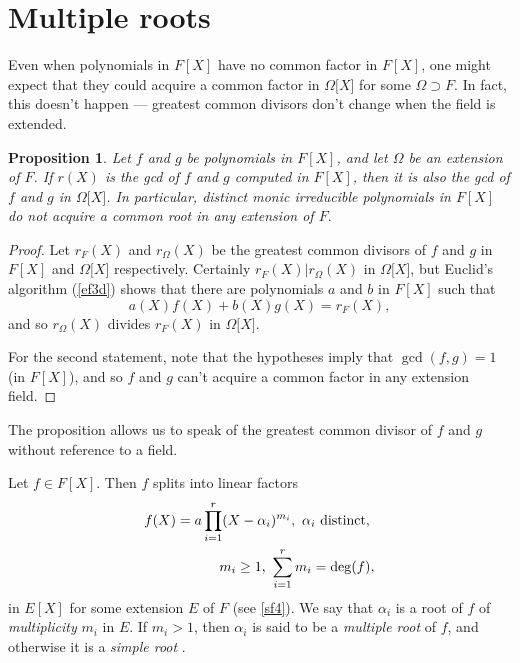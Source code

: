 \documentclass[a4paper,11pt,final,openany]{memoir}
\newtheorem{proposition}[X]{Proposition}
\theoremstyle{nonumberplain}
\newtheorem{proof}{Proof.}
\begin{document}
\section{Multiple roots}

Even when polynomials in $F[X]$ have no common factor in $F[X]$, one might
expect that they could acquire a common factor in $\Omega\lbrack X]$ for some
$\Omega\supset F$. In fact, this doesn't happen --- greatest common divisors
don't change when the field is extended.

\begin{proposition}
\label{ft1}Let $f$ and $g$ be polynomials in $F[X]$, and let $\Omega$ be an
extension of $F$. If $r(X)$ is the gcd of $f$ and $g$ computed in $F[X]$, then
it is also the gcd of $f$ and $g$ in $\Omega\lbrack X]$. In particular,
distinct monic irreducible polynomials in $F[X]$ do not acquire a common root
in any extension of $F.$
\end{proposition}

\begin{proof}
Let $r_{F}(X)$ and $r_{\Omega}(X)$ be the greatest common divisors of $f$ and
$g$ in $F[X]$ and $\Omega\lbrack X]$ respectively. Certainly $r_{F}%
(X)|r_{\Omega}(X)$ in $\Omega\lbrack X]$, but Euclid's algorithm (\ref{ef3d})
shows that there are polynomials $a$ and $b$ in $F[X]$ such that
\[
a(X)f(X)+b(X)g(X)=r_{F}(X),
\]
and so $r_{\Omega}(X)$ divides $r_{F}(X)$ in $\Omega\lbrack X]$.

For the second statement, note that the hypotheses imply that $\gcd(f,g)=1$
(in $F[X]$), and so $f$ and $g$ can't acquire a common factor in any extension field.
\end{proof}

The proposition allows us to speak of the greatest common divisor of $f$ and
$g$ without reference to a field.

Let $f\in F[X]$. Then $f$ splits into linear factors
\begin{align}
f(X)=a\prod_{i=1}^{r}(X-\alpha_{i})^{m_{i}},\text{ }\alpha_{i}\text{ distinct,
}\notag\\
m_{i}\geq1\text{, }\sum_{i=1}^{r}m_{i}=\deg(f), \label{eq5}%
\end{align}
in $E[X]$ for some extension $E$ of $F$ (see \ref{sf4}). We say that
$\alpha_{i}$ is a root of $f$ of \emph{multiplicity}%
$m_{i}$ in $E$. If $m_{i}>1$, then $\alpha_{i}$ is said to be a \emph{multiple
root }%
of $f$, and otherwise it is a \emph{simple root}%
%
.
\end{document}

